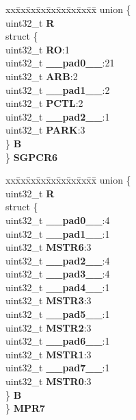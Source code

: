 \begin{DoxyCompactItemize}
\begin{tabbing}
\end{tabbing}\item 
\mbox{\label{structXBAR__tag_a440bcc312db28aff662ed9b8a36f3f68}} 
\begin{tabbing}
xx\=xx\=xx\=xx\=xx\=xx\=xx\=xx\=xx\=\kill
union \{\\
\>uint32\_t {\bfseries R}\\
\>struct \{\\
\>\>uint32\_t {\bfseries RO}:1\\
\>\>uint32\_t {\bfseries \_\_pad0\_\_}:21\\
\>\>uint32\_t {\bfseries ARB}:2\\
\>\>uint32\_t {\bfseries \_\_pad1\_\_}:2\\
\>\>uint32\_t {\bfseries PCTL}:2\\
\>\>uint32\_t {\bfseries \_\_pad2\_\_}:1\\
\>\>uint32\_t {\bfseries PARK}:3\\
\>\} {\bfseries B}\\
\} {\bfseries SGPCR6}\\

\end{tabbing}\item 
\mbox{\label{structXBAR__tag_a166fed80974fcbea3f84d2aa25b5b01c}} 
\begin{tabbing}
xx\=xx\=xx\=xx\=xx\=xx\=xx\=xx\=xx\=\kill
union \{\\
\>uint32\_t {\bfseries R}\\
\>struct \{\\
\>\>uint32\_t {\bfseries \_\_pad0\_\_}:4\\
\>\>uint32\_t {\bfseries \_\_pad1\_\_}:1\\
\>\>uint32\_t {\bfseries MSTR6}:3\\
\>\>uint32\_t {\bfseries \_\_pad2\_\_}:4\\
\>\>uint32\_t {\bfseries \_\_pad3\_\_}:4\\
\>\>uint32\_t {\bfseries \_\_pad4\_\_}:1\\
\>\>uint32\_t {\bfseries MSTR3}:3\\
\>\>uint32\_t {\bfseries \_\_pad5\_\_}:1\\
\>\>uint32\_t {\bfseries MSTR2}:3\\
\>\>uint32\_t {\bfseries \_\_pad6\_\_}:1\\
\>\>uint32\_t {\bfseries MSTR1}:3\\
\>\>uint32\_t {\bfseries \_\_pad7\_\_}:1\\
\>\>uint32\_t {\bfseries MSTR0}:3\\
\>\} {\bfseries B}\\
\} {\bfseries MPR7}\\


\end{tabbing}
\end{DoxyCompactItemize}
